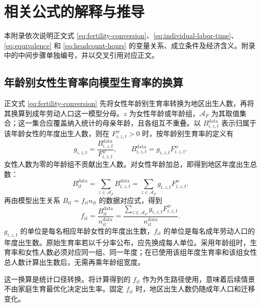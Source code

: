 \documentclass[UTF8,a4paper,zihao=-4,fontset=windows]{ctexart}
\numberwithin{equation}{section}
\begin{document}
\section{相关公式的解释与推导}
\label{app:derivations}

本附录依次说明正文式 \eqref{eq:fertility-conversion}、\eqref{eq:individual-labor-time}、\eqref{eq:equivalence} 和 \eqref{eq:headcount-hours} 的变量关系、成立条件及经济含义。附录中的中间步骤单独编号，并以交叉引用对应正文。

\subsection{年龄别女性生育率向模型生育率的换算}
\label{app:fertility-conversion}

正文式 \eqref{eq:fertility-conversion} 先将女性年龄别生育率转换为地区出生人数，再将其换算到成年劳动人口这一模型分母。$z$ 为女性年龄或年龄组，$\mathcal A_F$ 为其取值集合；这一集合应覆盖纳入统计的母亲年龄，且各组互不重叠。以 $B^{\mathrm{data}}_{i,z,t}$ 表示归属于该年龄女性的年度出生人数，则在 $F^w_{i,z,t}>0$ 时，按年龄别生育率的定义有
\begin{equation}
  g_{i,z,t}=\frac{B^{\mathrm{data}}_{i,z,t}}{F^w_{i,z,t}},
  \qquad
  B^{\mathrm{data}}_{i,z,t}=g_{i,z,t}F^w_{i,z,t}.
  \label{eq:app-age-specific-births}
\end{equation}
女性人数为零的年龄组不贡献出生人数。对女性年龄加总，即得到地区年度出生总数：
\begin{equation}
  B^{\mathrm{data}}_{it}
  =\sum_{z\in\mathcal A_F}B^{\mathrm{data}}_{i,z,t}
  =\sum_{z\in\mathcal A_F}g_{i,z,t}F^w_{i,z,t}.
  \label{eq:app-total-births}
\end{equation}
再由模型出生关系 $B_{it}=f_{it}n_{it}$ 的数据对应式，得到
\begin{equation}
  f_{it}=\frac{B^{\mathrm{data}}_{it}}{n^{\mathrm{data}}_{it}}
  =\frac{\sum_{z\in\mathcal A_F}g_{i,z,t}F^w_{i,z,t}}
         {n^{\mathrm{data}}_{it}}.
  \label{eq:app-fertility-conversion}
\end{equation}
$g_{i,z,t}$ 的单位是每名相应年龄女性的年度出生数，$f_{it}$ 的单位是每名成年劳动人口的年度出生数。原始生育率若以千分率公布，应先换成每人单位。采用年龄组时，生育率和女性人数必须对应同一组、同一年度；在已使用该组年度生育率和该组女性总人数计算出生数后，无需再乘年龄组宽度。

这一换算是统计口径转换。将计算得到的 $f_{it}$ 作为外生路径使用，意味着后续情景不由家庭生育最优化决定出生率。固定 $f_{it}$ 时，地区出生人数仍随成年人口和迁移变化。
\end{document}
